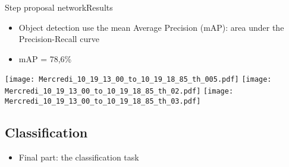 \begin{frame}{Step proposal network}{Results}
\centering
\begin{minipage}[t]{0.8\linewidth}\vspace{0pt}
    \begin{itemize}
        \item Object detection use the mean Average Precision (mAP): area under the Precision-Recall curve
        \item mAP = 78,6\%
    \end{itemize}
\vspace{-0.1cm}
\renewcommand{\ratio}{0.7}
    \begin{overprint}
        \onslide<+>\centering\texttt{[image: Mercredi\_10\_19\_13\_00\_to\_10\_19\_18\_85\_th\_005.pdf]}
        \onslide<+>\centering\texttt{[image: Mercredi\_10\_19\_13\_00\_to\_10\_19\_18\_85\_th\_02.pdf]}
        \onslide<+->\centering\texttt{[image: Mercredi\_10\_19\_13\_00\_to\_10\_19\_18\_85\_th\_03.pdf]}
    \end{overprint}
\end{minipage}
\end{frame}



\subsection{Classification}

\begin{frame}{\algo}{}

    
\medskip
\begin{itemize}
\centering
    \item Final part: the classification task
\end{itemize}
\end{frame}


